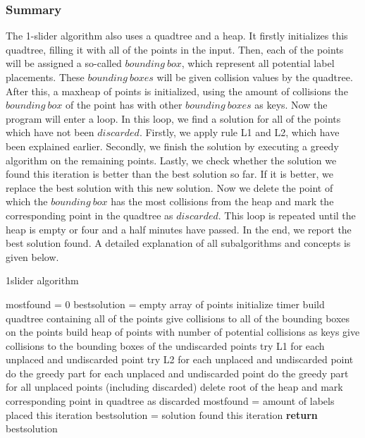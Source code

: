 \documentclass[crop=false,a4paper,oneside,11pt]{article}
\begin{document}
\subsubsection{Summary}
The 1-slider algorithm also uses a quadtree and a heap. It firstly initializes this quadtree, filling it with all of the points in the input. Then, each of the points will be assigned a so-called $bounding\ box$, which represent all potential label placements. These $bounding \ boxes$ will be given collision values by the quadtree. After this, a maxheap of points is initialized, using the amount of collisions the $bounding \ box$ of the point has with other $bounding \ boxes$ as keys. Now the program will enter a loop. In this loop, we find a solution for all of the points which have not been $discarded$. Firstly, we apply rule L1 and L2, which have been explained earlier. Secondly, we finish the solution by executing a greedy algorithm on the remaining points. Lastly, we check whether the solution we found this iteration is better than the best solution so far. If it is better, we replace the best solution with this new solution. Now we delete the point of which the $bounding \ box$ has the most collisions from the heap and mark the corresponding point in the quadtree as $discarded$. This loop is repeated until the heap is empty or four and a half minutes have passed. In the end, we report the best solution found. A detailed explanation of all subalgorithms and concepts is given below. \\
 \begin{algorithm}[H]
\caption{1slider algorithm}
\begin{algorithmic}[1]
\State mostfound = 0
\State bestsolution = empty array of points
\State initialize timer
\State build quadtree containing all of the points
\State give collisions to all of the bounding boxes on the points
\State build heap of points with number of potential collisions as keys
\State give collisions to the bounding boxes of the undiscarded points
\State try L1 for each unplaced and undiscarded point
\State try L2 for each unplaced and undiscarded point
\State do the greedy part for each unplaced and undiscarded point
\State do the greedy part for all unplaced points (including discarded)
\State delete root of the heap and mark corresponding point in quadtree as discarded
\State mostfound = amount of labels placed this iteration
\State bestsolution = solution found this iteration
\EndIf
\EndWhile
\State \textbf{return} bestsolution
\EndProcedure
\end{algorithmic}
\end{algorithm}
\end{document}

